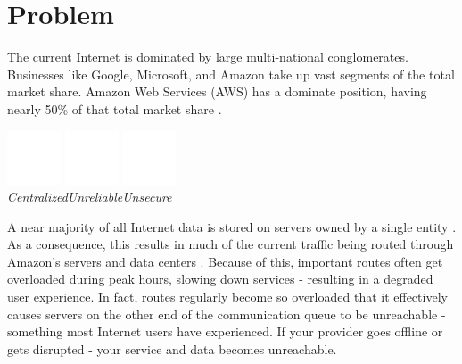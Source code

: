 \documentclass[a4paper,oneside]{article}
\begin{document}
\newpage
\section{Problem}
The current Internet is dominated by large multi-national conglomerates. Businesses like Google, Microsoft, and Amazon take up vast segments of the total market share. Amazon Web Services (AWS) has a dominate position, having nearly 50\% of that total market share \cite{jeb2019}.

\begin{center}
\includegraphics[width=45pt]{centralized}
\hspace{1.5cm}
\includegraphics[width=45pt]{unreliable}
\hspace{1.5cm}
\includegraphics[width=45pt]{unsecure}
\\
\vspace{0.1cm}
\hspace{0pt}\emph{Centralized}\hspace{50pt}\emph{Unreliable}\hspace{54pt}\emph{Unsecure}\hspace{24pt}
\end{center}

\noindent A near majority of all Internet data is stored on servers owned by a single entity \cite{jeb2019}. As a consequence, this results in much of the current traffic being routed through Amazon’s servers and data centers \cite{jeb2019}. Because of this, important routes often get overloaded during peak hours, slowing down services - resulting in a degraded user experience. In fact, routes regularly become so overloaded that it effectively causes servers on the other end of the communication queue to be unreachable - something most Internet users have experienced. If your provider goes offline or gets disrupted - your service and data becomes unreachable.
\end{document}
